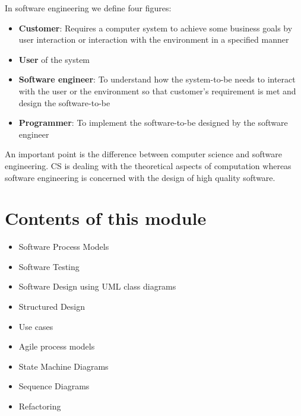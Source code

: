 \documentclass{article}
\begin{document}
	In software engineering we define four figures:
	\begin{itemize}
		\item \textbf{Customer}: Requires a computer system to achieve some business goals
		by user interaction or interaction with the environment
		in a specified manner
		\item \textbf{User} of the system
		\item \textbf{Software engineer}: To understand how the system-to-be
		needs to interact with the user or the environment so that
		customer's requirement is met and design the software-to-be
		\item \textbf{Programmer}: To implement the software-to-be
		designed by the software engineer
	\end{itemize}
	
	An important point is the difference between computer science and software engineering.
	CS is dealing with the theoretical aspects of computation whereas software engineering
	is concerned with the design of high quality software.
	
	\section{Contents of this module}
	\begin{itemize}
		\item Software Process Models
		\item Software Testing
		\item Software Design using UML class diagrams
		\item Structured Design
		\item Use cases
		\item Agile process models
		\item State Machine Diagrams
		\item Sequence Diagrams
		\item Refactoring
	\end{itemize}
	
\end{document}
